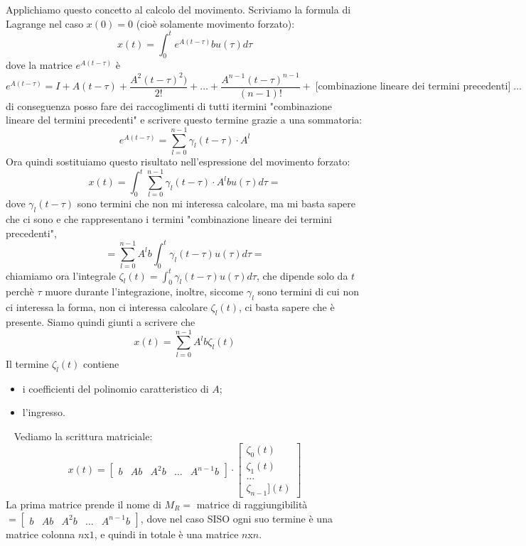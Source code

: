 \newline
Applichiamo questo concetto al calcolo del movimento.\newline
Scriviamo la formula di Lagrange nel caso $x(0) = 0$ (cioè solamente movimento forzato):
\[
    x(t) = \int_{0}^{t}e^{A(t-\tau)} b u(\tau) d \tau
\]
dove la matrice $e^{A(t - \tau)}$ è
\[
    e^{A(t - \tau)} = I +A(t-\tau) + \frac{A^2(t-\tau)^2)}{2!} + \dots + \frac{A^{n-1} (t - \tau)^{n-1}}{(n-1)!} +\; \text{[combinazione lineare dei termini precedenti]}\;\dots 
\]
di conseguenza posso fare dei raccoglimenti di tutti itermini "combinazione lineare del termini precedenti" e scrivere questo termine grazie a una sommatoria:
\[
    e^{A(t - \tau)} = \sum_{l=0}^{n-1} \gamma_l(t-\tau) \cdot  A^l
\]
Ora quindi sostituiamo questo risultato nell'espressione del movimento forzato:
\[
    x(t) = \int_{0}^{t} \sum_{l=0}^{n-1} \gamma_l(t-\tau) \cdot  A^l b u(\tau)d \tau=
\]
dove $\gamma_l(t-\tau)$ sono termini che non mi interessa calcolare, ma mi basta sapere che ci sono e che rappresentano i termini "combinazione lineare dei termini precedenti",
\[
    = \sum_{l=0}^{n-1} A^l b \int_{0}^{t}\gamma_l (t-\tau) u(\tau)d \tau=
\]
chiamiamo ora l'integrale $\zeta_l (t) = \int_{0}^{t}\gamma_l (t-\tau) u(\tau)d \tau$, che dipende solo da $t$ perchè $\tau$ muore durante l'integrazione, inoltre, siccome $\gamma_l$ sono termini di cui non ci interessa la forma, non ci interessa calcolare $\zeta_l (t)$, ci basta sapere che è presente.\newline
\newline
Siamo quindi giunti a scrivere che
\[
    x(t) = \sum_{l=0}^{n-1} A^l b \zeta_l(t)
\]
Il termine $\zeta_l(t)$ contiene
\begin{itemize}
    \item i coefficienti del polinomio caratteristico di $A$;
    \item l'ingresso.
\end{itemize}
\ \newline
Vediamo la scrittura matriciale:
\[
    x(t) = \left[\begin{matrix}
        b & Ab & A^2 b & \dots & A^{n-1}b
    \end{matrix}\right] \cdot  \left[\begin{matrix}
        \zeta_0(t)\\
        \zeta_1(t)\\
        \dots\\
        \zeta_{n-1}](t)
    \end{matrix}\right]
\]
La prima matrice prende il nome di $M_R=$ matrice di raggiungibilità $=\left[\begin{matrix}
    b & Ab & A^2 b & \dots & A^{n-1}b
\end{matrix}\right] $, dove nel caso SISO ogni suo termine è una matrice colonna $n$x$1$, e quindi in totale è una matrice $n$x$n$.\newline
